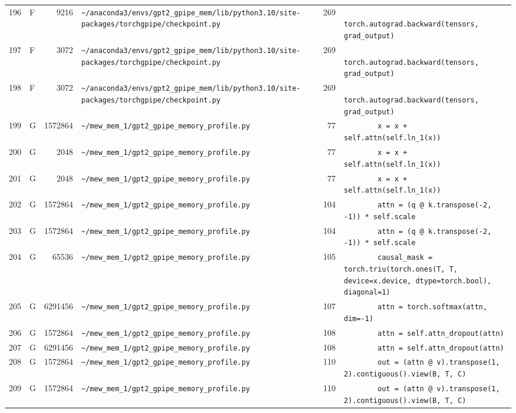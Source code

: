 \documentclass{article}
\begin{document}
\begin{longtable}{r l r p{6.5cm} r p{7.0cm}}
196 & F & 9216 & \lstinline|~/anaconda3/envs/gpt2_gpipe_mem/lib/python3.10/site-packages/torchgpipe/checkpoint.py| & 269 & \lstinline|            torch.autograd.backward(tensors, grad_output)| \\
197 & F & 3072 & \lstinline|~/anaconda3/envs/gpt2_gpipe_mem/lib/python3.10/site-packages/torchgpipe/checkpoint.py| & 269 & \lstinline|            torch.autograd.backward(tensors, grad_output)| \\
198 & F & 3072 & \lstinline|~/anaconda3/envs/gpt2_gpipe_mem/lib/python3.10/site-packages/torchgpipe/checkpoint.py| & 269 & \lstinline|            torch.autograd.backward(tensors, grad_output)| \\
199 & G & 1572864 & \lstinline|~/mew_mem_1/gpt2_gpipe_memory_profile.py| & 77 & \lstinline|        x = x + self.attn(self.ln_1(x))| \\
200 & G & 2048 & \lstinline|~/mew_mem_1/gpt2_gpipe_memory_profile.py| & 77 & \lstinline|        x = x + self.attn(self.ln_1(x))| \\
201 & G & 2048 & \lstinline|~/mew_mem_1/gpt2_gpipe_memory_profile.py| & 77 & \lstinline|        x = x + self.attn(self.ln_1(x))| \\
202 & G & 1572864 & \lstinline|~/mew_mem_1/gpt2_gpipe_memory_profile.py| & 104 & \lstinline|        attn = (q @ k.transpose(-2, -1)) * self.scale| \\
203 & G & 1572864 & \lstinline|~/mew_mem_1/gpt2_gpipe_memory_profile.py| & 104 & \lstinline|        attn = (q @ k.transpose(-2, -1)) * self.scale| \\
204 & G & 65536 & \lstinline|~/mew_mem_1/gpt2_gpipe_memory_profile.py| & 105 & \lstinline|        causal_mask = torch.triu(torch.ones(T, T, device=x.device, dtype=torch.bool), diagonal=1)| \\
205 & G & 6291456 & \lstinline|~/mew_mem_1/gpt2_gpipe_memory_profile.py| & 107 & \lstinline|        attn = torch.softmax(attn, dim=-1)| \\
206 & G & 1572864 & \lstinline|~/mew_mem_1/gpt2_gpipe_memory_profile.py| & 108 & \lstinline|        attn = self.attn_dropout(attn)| \\
207 & G & 6291456 & \lstinline|~/mew_mem_1/gpt2_gpipe_memory_profile.py| & 108 & \lstinline|        attn = self.attn_dropout(attn)| \\
208 & G & 1572864 & \lstinline|~/mew_mem_1/gpt2_gpipe_memory_profile.py| & 110 & \lstinline|        out = (attn @ v).transpose(1, 2).contiguous().view(B, T, C)| \\
209 & G & 1572864 & \lstinline|~/mew_mem_1/gpt2_gpipe_memory_profile.py| & 110 & \lstinline|        out = (attn @ v).transpose(1, 2).contiguous().view(B, T, C)| \\

\end{longtable}
\end{document}
